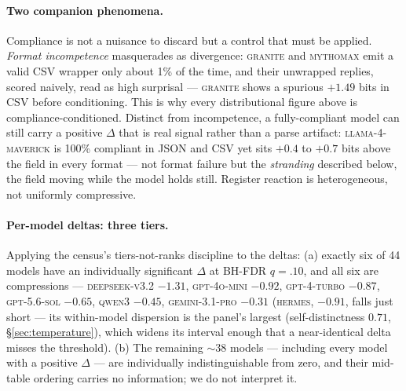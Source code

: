 \documentclass[11pt]{article}
\begin{document}
\paragraph{Two companion phenomena.}
Compliance is not a nuisance to discard but a control that must be applied. \emph{Format
incompetence} masquerades as divergence: \textsc{granite} and \textsc{mythomax} emit a valid CSV
wrapper only about 1\% of the time, and their unwrapped replies, scored naively, read as high
surprisal --- \textsc{granite} shows a spurious $+1.49$ bits in CSV before conditioning. This is
why every distributional figure above is compliance-conditioned. Distinct from incompetence, a
fully-compliant model can still carry a positive $\Delta$ that is real signal rather than a parse
artifact: \textsc{llama-4-maverick} is 100\% compliant in JSON and CSV yet sits $+0.4$ to $+0.7$
bits above the field in every format --- not format failure but the \emph{stranding} described
below, the field moving while the model holds still. Register reaction is heterogeneous, not
uniformly compressive.

\paragraph{Per-model deltas: three tiers.}
Applying the census's tiers-not-ranks discipline to the deltas: (a) exactly six of 44 models
have an individually significant $\Delta$ at BH-FDR $q=.10$, and all six are compressions ---
\textsc{deepseek-v3.2} $-1.31$, \textsc{gpt-4o-mini} $-0.92$, \textsc{gpt-4-turbo} $-0.87$,
\textsc{gpt-5.6-sol} $-0.65$, \textsc{qwen3} $-0.45$, \textsc{gemini-3.1-pro} $-0.31$
(\textsc{hermes}, $-0.91$, falls just short --- its within-model dispersion is the panel's
largest (self-distinctness $0.71$, \S\ref{sec:temperature}), which widens its interval enough that
a near-identical delta misses the threshold). (b) The remaining ${\sim}38$ models --- including every model
with a positive $\Delta$ --- are individually indistinguishable from zero, and their mid-table
ordering carries no information; we do not interpret it. 
\end{document}
